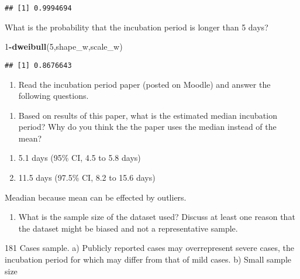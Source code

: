 \documentclass[
]{article}
\newenvironment{Shaded}{\begin{snugshade}}{\end{snugshade}}
\newcommand{\DecValTok}[1]{\textcolor[rgb]{0.00,0.00,0.81}{#1}}
\newcommand{\KeywordTok}[1]{\textcolor[rgb]{0.13,0.29,0.53}{\textbf{#1}}}
\newcommand{\NormalTok}[1]{#1}
\newcommand{\OperatorTok}[1]{\textcolor[rgb]{0.81,0.36,0.00}{\textbf{#1}}}
\providecommand{\tightlist}{%
  \setlength{\itemsep}{0pt}\setlength{\parskip}{0pt}}
\begin{document}
\begin{verbatim}
## [1] 0.9994694
\end{verbatim}

What is the probability that the incubation period is longer than 5
days?

\begin{Shaded}
\begin{Highlighting}[]
\DecValTok{1}\OperatorTok{-}\KeywordTok{dweibull}\NormalTok{(}\DecValTok{5}\NormalTok{,shape_w,scale_w)}
\end{Highlighting}
\end{Shaded}

\begin{verbatim}
## [1] 0.8676643
\end{verbatim}

\begin{enumerate}
\def\labelenumi{\arabic{enumi}.}
\setcounter{enumi}{1}
\tightlist
\item
  Read the incubation period paper (posted on Moodle) and answer the
  following questions.
\end{enumerate}

\begin{enumerate}
\def\labelenumi{(\arabic{enumi})}
\tightlist
\item
  Based on results of this paper, what is the estimated median
  incubation period? Why do you think the the paper uses the median
  instead of the mean?
\end{enumerate}

\begin{enumerate}
\def\labelenumi{\alph{enumi})}
\tightlist
\item
  5.1 days (95\% CI, 4.5 to 5.8 days)
\item
  11.5 days (97.5\% CI, 8.2 to 15.6 days)
\end{enumerate}

Meadian because mean can be effected by outliers.

\begin{enumerate}
\def\labelenumi{(\arabic{enumi})}
\setcounter{enumi}{1}
\tightlist
\item
  What is the sample size of the dataset used? Discuss at least one
  reason that the dataset might be biased and not a representative
  sample.
\end{enumerate}

181 Cases sample. a) Publicly reported cases may overrepresent severe
cases, the incubation period for which may differ from that of mild
cases. b) Small sample size
\end{document}
